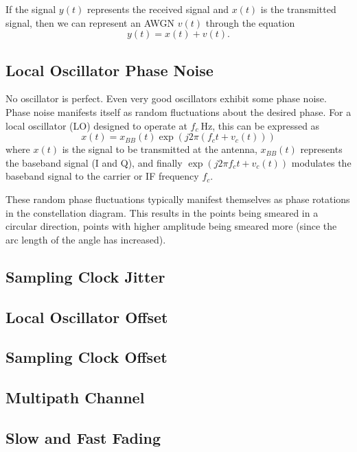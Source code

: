 \documentclass[conference]{IEEEtran}
\begin{document}
If the signal $y(t)$ represents the received signal and $x(t)$ is the transmitted
signal, then we can represent an AWGN $v(t)$ through the equation
\begin{equation}
y(t) = x(t) + v(t).
\end{equation}

\subsection*{Local Oscillator Phase Noise}
No oscillator is perfect. Even very good oscillators exhibit some phase noise.
Phase noise manifests itself as random fluctuations about the desired phase. For
a local oscillator (LO) designed to operate at $f_c\:\mbox{Hz}$, this can be
expressed as
\begin{equation}
x(t) = x_{BB}(t) \exp\left(j 2 \pi \left( f_c t + v_c(t) \right)\right)
\end{equation}
where $x(t)$ is the signal to be transmitted at the antenna, $x_{BB}(t)$
represents the baseband signal (I and Q), and finally
$\exp\left(j 2 \pi f_c t + v_c(t)\right)$ modulates the baseband signal
to the carrier or IF frequency $f_c$.

These random phase fluctuations typically manifest themselves as phase
rotations in the constellation diagram. This results in the points
being smeared in a circular direction, points with higher amplitude
being smeared more (since the arc length of the angle has increased).

\subsection*{Sampling Clock Jitter}

\subsection*{Local Oscillator Offset}

\subsection*{Sampling Clock Offset}

\subsection*{Multipath Channel}

\subsection*{Slow and Fast Fading}
\end{document}
